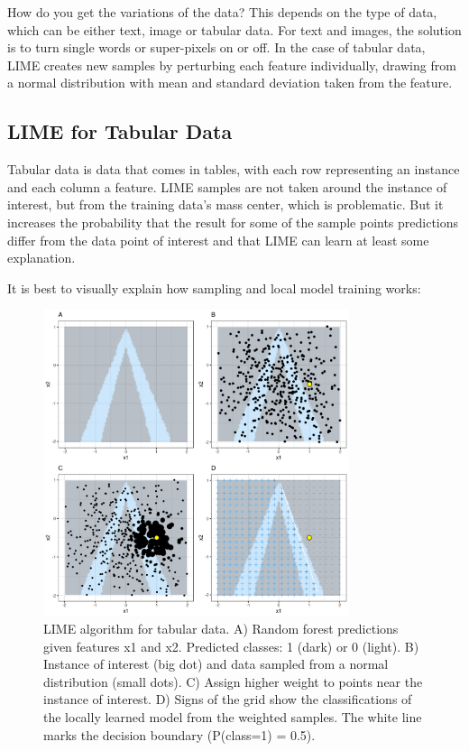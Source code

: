 \documentclass[
  10pt,
]{scrbook}
\begin{document}
How do you get the variations of the data?
This depends on the type of data, which can be either text, image or tabular data.
For text and images, the solution is to turn single words or super-pixels on or off.
In the case of tabular data, LIME creates new samples by perturbing each feature individually, drawing from a normal distribution with mean and standard deviation taken from the feature.

\hypertarget{lime-for-tabular-data}{%
\subsection{LIME for Tabular Data}\label{lime-for-tabular-data}}

Tabular data is data that comes in tables, with each row representing an instance and each column a feature.
LIME samples are not taken around the instance of interest, but from the training data's mass center, which is problematic.
But it increases the probability that the result for some of the sample points predictions differ from the data point of interest and that LIME can learn at least some explanation.

It is best to visually explain how sampling and local model training works:

\begin{figure}

{\centering \includegraphics[width=0.8\textwidth]{images/lime-fitting-1} 

}

\caption{LIME algorithm for tabular data. A) Random forest predictions given features x1 and x2. Predicted classes: 1 (dark) or 0 (light). B) Instance of interest (big dot) and data sampled from a normal distribution (small dots). C) Assign higher weight to points near the instance of interest. D) Signs of the grid show the classifications of the locally learned model from the weighted samples. The white line marks the decision boundary (P(class=1) = 0.5).}\label{fig:lime-fitting}
\end{figure}
\end{document}
